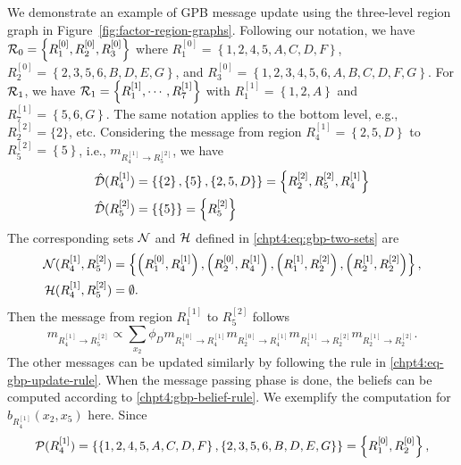 \begin{example}
  We demonstrate an example of GPB message update using the three-level region graph in Figure~\ref{fig:factor-region-graphs}. Following our notation, we have $\mathcal{R}_0 = \left\{ R_1^{[0]}, R_2^{[0]}, R_3^{[0]} \right\}$ where $R_1^{[0]} = \left\{ 1, 2, 4, 5, A, C, D, F \right\}$, $R_2^{[0]} = \left\{ 2, 3, 5, 6, B, D, E, G \right\}$, and $R_3^{[0]} = \left\{ 1, 2, 3, 4, 5, 6, A, B, C, D, F, G \right\}$. For $\mathcal{R}_1$, we have $\mathcal{R}_1 = \left\{ R_1^{[1]}, \cdots , R_7^{[1]} \right\}$ with $R_1^{[1]} = \left\{ 1, 2, A \right\}$ and $R_7^{[1]} = \left\{ 5, 6, G \right\}$. The same notation applies to the bottom level, e.g., $R^{[2]}_2 = \{2\}$, etc.
  Considering the message from region $R^{[1]}_4 = \left\{ 2, 5, D \right\}$ to $R^{[2]}_5 = \left\{ 5 \right\}$, i.e., $m_{R^{[1]}_4 \rightarrow R^{[2]}_5}$, we have
  \begin{align*}
    \hat{\mathcal{D}}(R^{[1]}_4) &= \left\{ \left\{ 2 \right\}, \left\{ 5 \right\}, \left\{ 2, 5, D \right\}\right\} = \left\{ R^{[2]}_2, R^{[2]}_5, R^{[1]}_4 \right\} \\
    \hat{\mathcal{D}}(R^{[2]}_5) & = \left\{ \left\{ 5 \right\} \right\} = \left\{ R^{[2]}_5 \right\}
  \end{align*}
  The corresponding sets $\mathcal{N}$ and $\mathcal{H}$ defined in \eqref{chpt4:eq:gbp-two-sets} are
  \begin{align*}
    \mathcal{N}(R^{[1]}_4, R^{[2]}_5) & = \left\{ \left( R^{[0]}_1, R^{[1]}_4 \right), \left( R^{[0]}_2, R^{[1]}_4 \right), \left( R^{[1]}_1, R^{[2]}_2 \right), \left( R^{[1]}_2, R^{[2]}_2 \right) \right\}, \\
    \mathcal{H}(R^{[1]}_4, R^{[2]}_5) & = \emptyset.
  \end{align*}
  Then the message from region $R^{[1]}_1$ to $R^{[2]}_5$ follows
  \begin{equation*}
    m_{R^{[1]}_4 \rightarrow R^{[2]}_5} \propto \sum_{x_2}\phi_D m_{R^{[0]}_1\rightarrow R^{[1]}_4} m_{R^{[0]}_2\rightarrow R^{[1]}_4} m_{ R^{[1]}_1\rightarrow R^{[2]}_2 } m_{ R^{[1]}_2 \rightarrow R^{[2]}_2}.
    \end{equation*}
    The other messages can be updated similarly by following the rule in \eqref{chpt4:eq-gbp-update-rule}. When the message passing phase is done, the beliefs can be computed according to \eqref{chpt4:gbp-belief-rule}. We exemplify the computation for $b_{R^{[1]}_4}(x_2, x_5)$ here. Since
    \begin{align*}
      \Pp(R^{[1]}_4)  &= \left\{ \left\{ 1, 2, 4, 5, A, C, D, F \right\}, \left\{ 2, 3, 5, 6, B, D, E, G \right\} \right\}=\left\{ R_1^{[0]}, R_2^{[0]}\right\}, \\

\end{align*}
\end{example}
